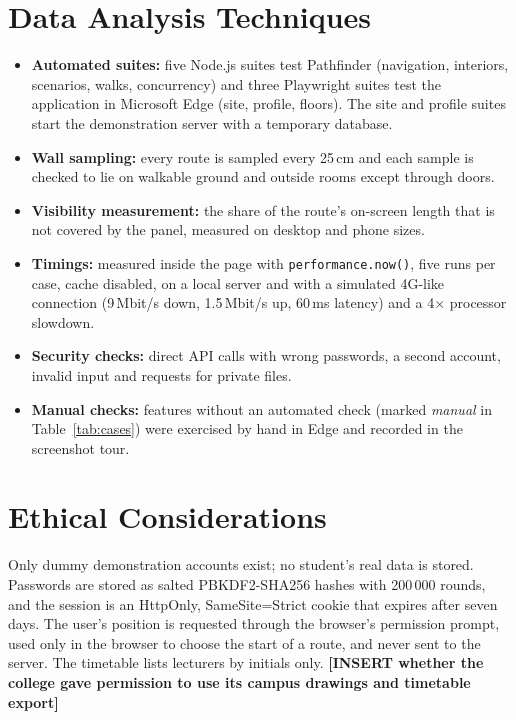 \documentclass[12pt,a4paper]{report}
\newcommand{\placeholder}[1]{\textbf{[INSERT #1]}}
\begin{document}
\section{Data Analysis Techniques}
\begin{itemize}
  \item \textbf{Automated suites:} five Node.js suites test Pathfinder (navigation, interiors, scenarios, walks, concurrency) and three Playwright suites test the application in Microsoft Edge (site, profile, floors). The site and profile suites start the demonstration server with a temporary database.
  \item \textbf{Wall sampling:} every route is sampled every 25\,cm and each sample is checked to lie on walkable ground and outside rooms except through doors.
  \item \textbf{Visibility measurement:} the share of the route's on-screen length that is not covered by the panel, measured on desktop and phone sizes.
  \item \textbf{Timings:} measured inside the page with \texttt{performance.now()}, five runs per case, cache disabled, on a local server and with a simulated 4G-like connection (9\,Mbit/s down, 1.5\,Mbit/s up, 60\,ms latency) and a 4$\times$ processor slowdown.
  \item \textbf{Security checks:} direct API calls with wrong passwords, a second account, invalid input and requests for private files.
  \item \textbf{Manual checks:} features without an automated check (marked \emph{manual} in Table~\ref{tab:cases}) were exercised by hand in Edge and recorded in the screenshot tour.
\end{itemize}

\section{Ethical Considerations}
Only dummy demonstration accounts exist; no student's real data is stored. Passwords are stored as salted PBKDF2-SHA256 hashes with 200\,000 rounds, and the session is an HttpOnly, SameSite=Strict cookie that expires after seven days. The user's position is requested through the browser's permission prompt, used only in the browser to choose the start of a route, and never sent to the server. The timetable lists lecturers by initials only. \placeholder{whether the college gave permission to use its campus drawings and timetable export}

\end{document}
